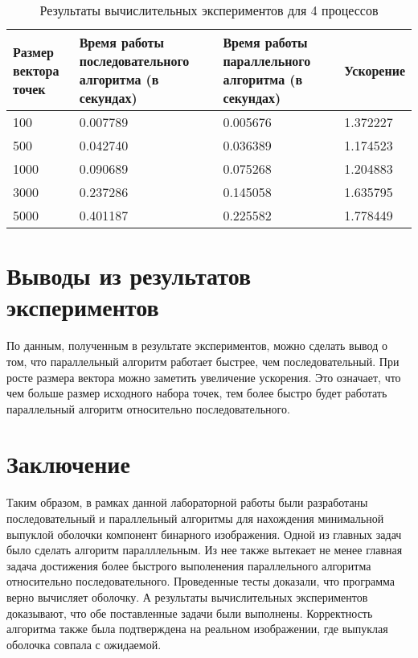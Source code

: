 \documentclass{report}
\begin{document}
\begin{table}[!h]
\caption{Результаты вычислительных экспериментов для 4 процессов}
\centering
\begin{tabular}{| p{2cm} | p{3cm} | p{4cm} | p{2cm} |}
\hline
Размер вектора точек & Время работы последовательного алгоритма (в секундах) & Время работы параллельного алгоритма (в секундах) & Ускорение  \\[5pt]
\hline
100        & 0.007789   & 0.005676    & 1.372227      \\
500       & 0.042740    & 0.036389     & 1.174523       \\
1000       & 0.090689    & 0.075268     & 1.204883      \\
3000       & 0.237286     & 0.145058     & 1.635795       \\
5000       & 0.401187   & 0.225582    & 1.778449      \\
\hline
\end{tabular}
\end{table}


\newpage

\section*{Выводы из результатов экспериментов}
По данным, полученным в результате экспериментов, можно сделать вывод о том, что параллельный алгоритм работает быстрее, чем последовательный. При росте размера вектора можно заметить увеличение ускорения. Это означает, что чем больше размер исходного набора точек, тем более быстро будет работать параллельный алгоритм относительно последовательного. 

\newpage

\section*{Заключение}
Таким образом, в рамках данной лабораторной работы были разработаны последовательный и параллельный алгоритмы для нахождения минимальной выпуклой оболочки компонент бинарного изображения. Одной из главных задач было сделать алгоритм паралллельным. Из нее также вытекает не менее главная задача достижения более быстрого выполенения параллельного алгоритма относительно последовательного. Проведенные тесты доказали, что программа верно вычисляет оболочку. А результаты вычислительных экспериментов доказывают, что обе поставленные задачи были выполнены. Корректность алгоритма также была подтверждена на реальном изображении, где выпуклая оболочка совпала с ожидаемой.
\newpage
\end{document}
